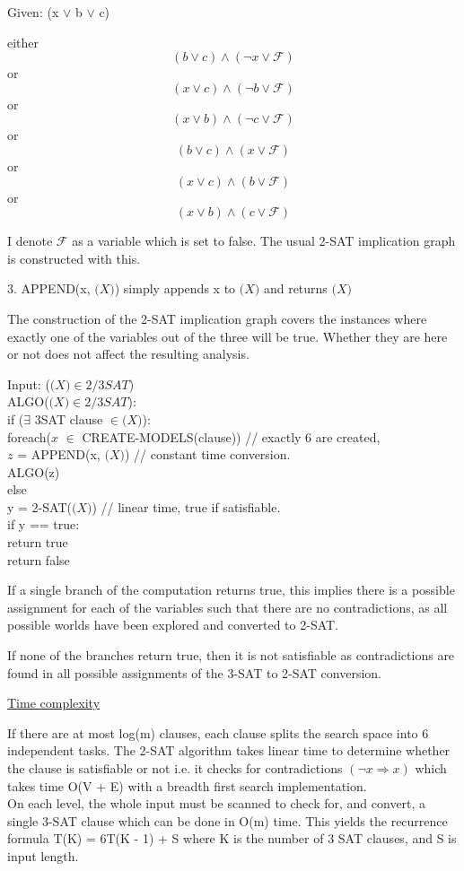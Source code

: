 \documentclass[11pt]{article}
\begin{document}
\begin{flushleft}
Given: (x $\vee$ b $\vee$ c)

either $$(b \vee c) \wedge (\neg x \vee \mathcal{F})$$ or $$(x \vee c) \wedge (\neg b \vee  \mathcal{F})$$ or $$(x \vee b) \wedge (\neg c \vee  \mathcal{F})$$ or $$(b \vee c) \wedge (x \vee  \mathcal{F})$$ or $$(x \vee c) \wedge (b \vee  \mathcal{F})$$ or $$(x \vee b) \wedge (c \vee  \mathcal{F})$$ 

I denote $\mathcal{F}$ as a variable which is set to false. The usual 2-SAT implication graph is constructed with this.

3. APPEND(x, $\mathcal(X)$) simply appends x to $\mathcal(X)$ and returns $\mathcal(X)$ 

The construction of the 2-SAT implication graph covers the instances where exactly one of the variables out of the three will be true. Whether they are here or not does not affect the resulting analysis.

Input: ($\mathcal(X) \in 2/3SAT$) \\

ALGO($\mathcal(X) \in 2/3SAT$): \\
\quad\quad	if ($\exists$ 3SAT clause $\in \mathcal(X)$): \\
\quad\quad\quad\quad		foreach($x$ $\in$ CREATE-MODELS(clause)) // exactly 6 are created, \\
\quad\quad\quad\quad\quad\quad			$z$ = APPEND(x, $\mathcal(X)$) // constant time conversion. \\
\quad\quad\quad\quad\quad\quad			ALGO(z) \\
\quad\quad	else  \\
\quad\quad\quad\quad		y = 2-SAT($\mathcal(X)$) // linear time, true if satisfiable. \\
\quad\quad\quad\quad		if y == true: \\
\quad\quad\quad\quad\quad\quad			return true\\

return false

If a single branch of the computation returns true, this implies there is a possible assignment for each of the variables such that there are no contradictions, as all possible worlds have been explored and converted to 2-SAT.

If none of the branches return true, then it is not satisfiable as contradictions are found in all possible assignments of the 3-SAT to 2-SAT conversion.

\underline{Time complexity}

If there are at most log(m) clauses, each clause splits the search space into 6 independent tasks. The 2-SAT algorithm takes linear time to determine whether the clause is satisfiable or not i.e. it checks for contradictions $(\neg x \Rightarrow x)$ which takes time O(V + E) with a breadth first search implementation. \\
On each level, the whole input must be scanned to check for, and convert, a single 3-SAT clause which can be done in O(m) time.
This yields the recurrence formula T(K) = 6T(K - 1) + S where K is the number of 3 SAT clauses, and S is input length.


\end{flushleft}
\end{document}
